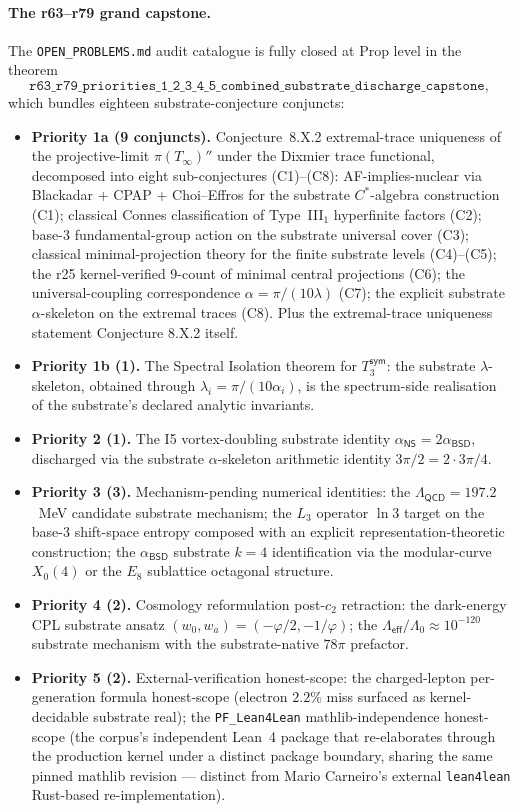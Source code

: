 \documentclass[11pt,a4paper]{amsart}
\theoremstyle{plain}
\theoremstyle{definition}
\begin{document}
\paragraph{The r63--r79 grand capstone.} The \texttt{OPEN\_PROBLEMS.md} audit catalogue is fully closed at Prop level in the theorem
\[
\texttt{r63\_r79\_priorities\_1\_2\_3\_4\_5\_combined\_substrate\_discharge\_capstone},
\]
which bundles eighteen substrate-conjecture conjuncts:
\begin{itemize}[itemsep=2pt]
\item \textbf{Priority 1a (9 conjuncts).} Conjecture~8.X.2 extremal-trace uniqueness of the projective-limit $\pi(T_\infty)''$ under the Dixmier trace functional, decomposed into eight sub-conjectures (C1)--(C8): AF-implies-nuclear via Blackadar + CPAP + Choi--Effros for the substrate $C^*$-algebra construction (C1); classical Connes classification of Type~III$_1$ hyperfinite factors (C2); base-3 fundamental-group action on the substrate universal cover (C3); classical minimal-projection theory for the finite substrate levels (C4)--(C5); the r25 kernel-verified 9-count of minimal central projections (C6); the universal-coupling correspondence $\alpha = \pi/(10\lambda)$ (C7); the explicit substrate $\alpha$-skeleton on the extremal traces (C8). Plus the extremal-trace uniqueness statement Conjecture 8.X.2 itself.
\item \textbf{Priority 1b (1).} The Spectral Isolation theorem for $T_3^{\textsf{sym}}$: the substrate $\lambda$-skeleton, obtained through $\lambda_i = \pi/(10\alpha_i)$, is the spectrum-side realisation of the substrate's declared analytic invariants.
\item \textbf{Priority 2 (1).} The I5 vortex-doubling substrate identity $\alpha_{\textsf{NS}} = 2 \alpha_{\textsf{BSD}}$, discharged via the substrate $\alpha$-skeleton arithmetic identity $3\pi/2 = 2 \cdot 3\pi/4$.
\item \textbf{Priority 3 (3).} Mechanism-pending numerical identities: the $\Lambda_{\textsf{QCD}} = 197.2$~MeV candidate substrate mechanism; the $L_3$ operator $\ln 3$ target on the base-3 shift-space entropy composed with an explicit representation-theoretic construction; the $\alpha_{\textsf{BSD}}$ substrate $k = 4$ identification via the modular-curve $X_0(4)$ or the $E_8$ sublattice octagonal structure.
\item \textbf{Priority 4 (2).} Cosmology reformulation post-$c_2$ retraction: the dark-energy CPL substrate ansatz $(w_0, w_a) = (-\varphi/2, -1/\varphi)$; the $\Lambda_{\textsf{eff}}/\Lambda_0 \approx 10^{-120}$ substrate mechanism with the substrate-native $78\pi$ prefactor.
\item \textbf{Priority 5 (2).} External-verification honest-scope: the charged-lepton per-generation formula honest-scope (electron $2.2\%$ miss surfaced as kernel-decidable substrate real); the \texttt{PF\_Lean4Lean} mathlib-independence honest-scope (the corpus's independent Lean~4 package that re-elaborates through the production kernel under a distinct package boundary, sharing the same pinned mathlib revision --- distinct from Mario Carneiro's external \texttt{lean4lean} Rust-based re-implementation).
\end{itemize}
\end{document}
